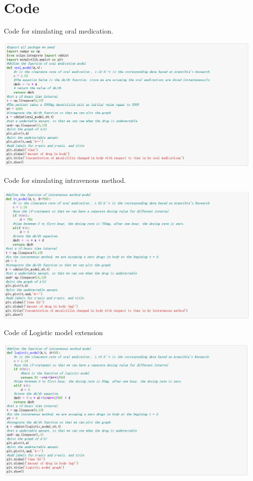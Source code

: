 \documentclass{article}
\begin{document}
\section*{Code}
Code for simulating oral medication.
\begin{center}
\includegraphics[scale = 0.6]{CodeOfOralSimulation.png} 
\end{center}
Code for simulating intravenous method.\\
\begin{center}
\includegraphics[scale = 0.6]{CodeOfIVSimulation.png} 
\end{center}
Code of Logistic model extension\\
\begin{center}
    \includegraphics[scale = 0.6]{CodeOfLogistic.png}
\end{center}
\end{document}
